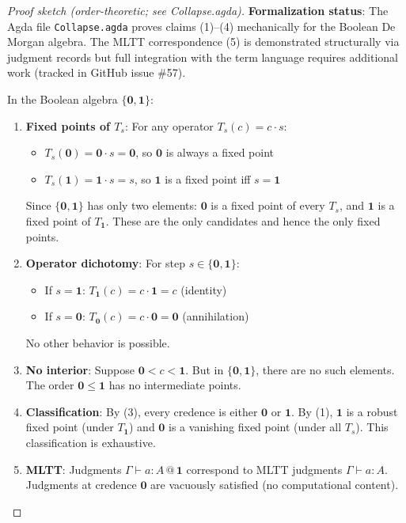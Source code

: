\documentclass[11pt,a4paper]{article}
\makeatletter
\newcommand{\at}[1]{\,@\,#1}
\newcommand{\one}{\mathbf{1}}
\newcommand{\zero}{\mathbf{0}}
\makeatother
\begin{document}
\begin{proof}[Proof sketch (order-theoretic; see Collapse.agda)]
\textbf{Formalization status}: The Agda file \texttt{Collapse.agda} proves claims (1)--(4) mechanically for the Boolean De Morgan algebra. The MLTT correspondence (5) is demonstrated structurally via judgment records but full integration with the term language requires additional work (tracked in GitHub issue \#57).

In the Boolean algebra $\{\zero,\one\}$:
\begin{enumerate}
    \item \textbf{Fixed points of $T_s$}: For any operator $T_s(c) = c \cdot s$:
    \begin{itemize}
        \item $T_s(\zero) = \zero \cdot s = \zero$, so $\zero$ is always a fixed point
        \item $T_s(\one) = \one \cdot s = s$, so $\one$ is a fixed point iff $s = \one$
    \end{itemize}
    Since $\{\zero,\one\}$ has only two elements: $\zero$ is a fixed point of every $T_s$, and $\one$ is a fixed point of $T_\one$. These are the only candidates and hence the only fixed points.

    \item \textbf{Operator dichotomy}: For step $s \in \{\zero, \one\}$:
    \begin{itemize}
        \item If $s = \one$: $T_\one(c) = c \cdot \one = c$ (identity)
        \item If $s = \zero$: $T_\zero(c) = c \cdot \zero = \zero$ (annihilation)
    \end{itemize}
    No other behavior is possible.

    \item \textbf{No interior}: Suppose $\zero < c < \one$. But in $\{\zero,\one\}$, there are no such elements. The order $\zero \leq \one$ has no intermediate points.

    \item \textbf{Classification}: By (3), every credence is either $\zero$ or $\one$. By (1), $\one$ is a robust fixed point (under $T_\one$) and $\zero$ is a vanishing fixed point (under all $T_s$). This classification is exhaustive.

    \item \textbf{MLTT}: Judgments $\Gamma \vdash a : A \at{\one}$ correspond to MLTT judgments $\Gamma \vdash a : A$. Judgments at credence $\zero$ are vacuously satisfied (no computational content).
\end{enumerate}
\end{proof}
\end{document}
